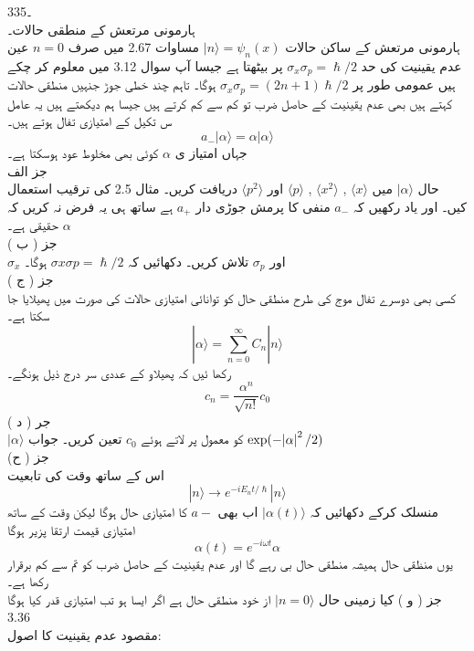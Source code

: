 3۔35\\
ہارمونی مرتعش کے منطقی حالات۔ \\
ہارمونی مرتعش کے ساکن حالات 
\(|n\rangle =\psi_{n}(x)\)
مساوات 2.67 میں صرف
\(n=0\)
عین عدم یقینیت کی حد
\(\sigma_{x}\sigma_{p}=\hslash/2\)
پر بیٹھتا ہے جیسا آپ سوال 3.12 میں معلوم کر چکے ہیں عمومی طور پر
\(\sigma_{x}\sigma_{p}=(2n+1)\hslash/2\)
ہوگا۔ تاہم چند خطی جوڑ جنہیں منطقی حالات کہتے ہیں بھی عدم یقینیت کے حاصل ضرب تو کم سے کم کرتے ہیں جیسا ہم دیکھتے ہیں یہ عامل س تکیل کے امتیازی تفال ہوتے ہیں۔\\
\[a_{-}|\alpha\rangle =\alpha|\alpha\rangle\]
جہاں امتیاز ی 
\(\alpha\)
کوئی بھی مخلوط عود ہوسکتا ہے۔\\
جز الف\\
حال 
\(|\alpha\rangle\)
میں
\(\langle x \rangle\)
,
\(\langle x^{2} \rangle\)
,
\(\langle p \rangle\)
اور
\(\langle p^{2} \rangle\)
دریافت کریں۔ مثال 2.5 کی ترقیب استعمال کیں۔ اور یاد رکھیں کہ
\(a_{-}\)
منفی کا پرمش جوڑی دار
\(a_{+}\)
ہے ساتھ ہی یہ فرض نہ کریں کہ
\(\alpha\)
حقیقی ہے۔\\
جز ( ب )\\
\(\sigma_{x}\)
اور
\(\sigma_{p}\)
تلاش کریں۔ دکھائیں کہ
\(\sigma{x}\sigma{p}=\hslash/2\)
ہوگا۔\\
جز ( ج )\\
کسی بھی دوسرے تفال موج کی طرح منطقی حال کو توانائی امتیازی حالات کی صورت میں پھیلایا جا سکتا ہے۔\\
\[|\alpha\rangle=\sum_{n=0}^{\infty}C_{n}|n\rangle\]
رکھا ئیں کہ پھیلاو کے عددی سر درج ذیل ہونگے۔\\
\[c_{n}=\frac{\alpha^{n}}{\sqrt{n!}}c_{0}\]
جر ( د )\\
\(|\alpha\rangle\)
کو معمول پر لاتے ہوئے
\(c_{0}\)
تعین کریں۔
جواب
\(\text{exp}(-\abs{\alpha}^{2}/2)\)\\
جز ( ح)\\
اس کے ساتھ وقت کی تابعیت\\
\[|n\rangle\rightarrow e^{-iE_{n}t/\hslash}|n\rangle\]
منسلک کرکے دکھائیں کہ
\(|\alpha(t)\rangle\)
اب بھی
\(a{-}\)
کا امتیازی حال ہوگا لیکن وقت کے ساتھ امتیازی قیمت ارتقا پزیر ہوگا\\
\[\alpha(t)=e^{-i\omega t}\alpha\]
یوں منظقی حال ہمیشہ منطقی حال بی رہے گا اور عدم یقینیت کے حاصل ضرب کو تم سے کم برقرار رکھا ہے۔\\
جز ( و ) کیا زمینی حال
\(|n=0\rangle\)
از خود منطقی حال ہے اگر ایسا ہو تب امتیازی قدر کیا ہوگا 
3.36\\
مقصود عدم یقینیت کا اصول:\\
